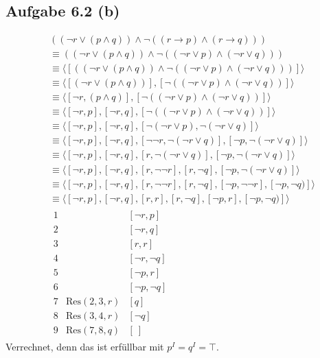 \documentclass[12pt,a4paper]{article}
\newcommand{\Res}{\text{Res}}
\begin{document}
\subsection*{Aufgabe 6.2 (b)}
\begin{align*}
&((\neg r\vee(p\wedge q))\wedge\neg((r\to p)\wedge(r\to q)))\\
&\equiv
((\neg r\vee(p\wedge q))\wedge\neg((\neg r\vee p)\wedge(\neg r\vee q)))\\
&\equiv
\langle[((\neg r\vee(p\wedge q))\wedge\neg((\neg r\vee p)\wedge(\neg r\vee q)))]\rangle\\
&\equiv
\langle[(\neg r\vee(p\wedge q))],[\neg((\neg r\vee p)\wedge(\neg r\vee q))]\rangle\\
&\equiv
\langle[\neg r,(p\wedge q)],[\neg((\neg r\vee p)\wedge(\neg r\vee q))]\rangle\\
&\equiv
\langle[\neg r, p],[\neg r, q],[\neg((\neg r\vee p)\wedge(\neg r\vee q))]\rangle\\
&\equiv
\langle[\neg r, p],[\neg r, q],[\neg(\neg r\vee p),\neg(\neg r\vee q)]\rangle\\
&\equiv
\langle[\neg r, p],[\neg r, q],[\neg\neg r,\neg(\neg r\vee q)],[\neg p,\neg(\neg r\vee q)]\rangle\\
&\equiv
\langle[\neg r, p],[\neg r, q],[r,\neg(\neg r\vee q)],[\neg p,\neg(\neg r\vee q)]\rangle\\
&\equiv
\langle[\neg r, p],[\neg r, q],[r,\neg\neg r],[r,\neg q],[\neg p,\neg(\neg r\vee q)]\rangle\\
&\equiv
\langle[\neg r, p],[\neg r, q],[r,\neg\neg r],[r,\neg q],[\neg p,\neg\neg r],[\neg p,\neg q)]\rangle\\
&\equiv
\langle[\neg r, p],[\neg r, q],[r,r],[r,\neg q],[\neg p, r],[\neg p,\neg q)]\rangle\\
&\begin{array}{rll}
1 &&[\neg r,p]\\
2 &&[\neg r,q]\\
3 &&[r,r]\\
4 &&[\neg r,\neg q]\\
5 &&[\neg p,r]\\
6 &&[\neg p,\neg q]\\
7 & \Res(2,3,r) & [q]\\
8 & \Res(3,4,r) & [\neg q]\\
9 & \Res(7,8,q) & [~]
\end{array}
\end{align*}
Verrechnet, denn das ist erfüllbar mit $p^I=q^I=\top$.
\end{document}
